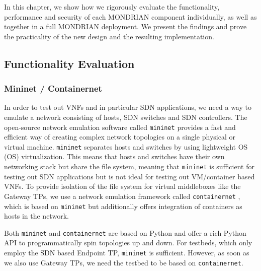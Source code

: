 In this chapter, we show how we rigorously evaluate the functionality, performance and security of each MONDRIAN component individually, as well as together in a full MONDRIAN deployment. We present the findings and prove the practicality of the new design and the resulting implementation. 

\subsection{Functionality Evaluation}
\subsubsection{Mininet / Containernet}
In order to test out \acsp{VNF} and in particular \acs{SDN} applications, we need a way to emulate a network consisting of hosts, \acs{SDN} switches and \acs{SDN} controllers. The open-source network emulation software called \texttt{mininet} \cite{mininet2021webpage} provides a fast and efficient way of creating complex network topologies on a single physical or virtual machine. \texttt{mininet} separates hosts and switches by using lightweight \acs{OS} (\acl{OS}) virtualization. This means that hosts and switches have their own networking stack but share the file system, meaning that \texttt{mininet} is sufficient for testing out \acs{SDN} applications but is not ideal for testing out \acs{VM}/container based \acsp{VNF}. To provide isolation of the file system for virtual middleboxes like the Gateway \acsp{TP}, we use a network emulation framework called \texttt{containernet} \cite{peuster2018containernet}, which is based on \texttt{mininet} but additionally offers integration of containers as hosts in the network. 

Both \texttt{mininet} and \texttt{containernet} are based on Python and offer a rich Python \acs{API} to programmatically spin topologies up and down. For testbeds, which only employ the \acs{SDN} based Endpoint \acs{TP}, \texttt{mininet} is sufficient. However, as soon as we also use Gateway \acsp{TP}, we need the testbed to be based on \texttt{containernet}.


